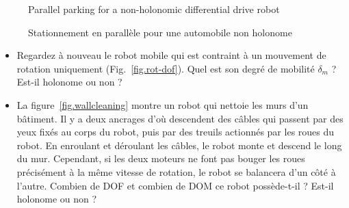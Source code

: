 \begin{figure}
\begin{minipage}{.45\textwidth}
\caption{Parallel parking for a non-holonomic differential drive robot}\label{fig.parallel-diff}
\end{minipage}
\hspace{\fill}
\begin{minipage}{.45\textwidth}
\caption{Stationnement en parallèle pour une automobile non holonome}\label{fig.parallel-car}
\end{minipage}
\end{figure}

\begin{framed}
\begin{itemize}
\item Regardez à nouveau le robot mobile qui est contraint à un mouvement de rotation uniquement (Fig.~\ref{fig.rot-dof}). Quel est son degré de mobilité $\delta_m$ ? Est-il holonome ou non ?
\item La figure~\ref{fig.wallcleaning} montre un robot qui nettoie les murs d'un bâtiment. Il y a deux ancrages d'où descendent des câbles qui passent par des yeux fixés au corps du robot, puis par des treuils actionnés par les roues du robot. En enroulant et déroulant les câbles, le robot monte et descend le long du mur. Cependant, si les deux moteurs ne font pas bouger les roues précisément à la même vitesse de rotation, le robot se balancera d'un côté à l'autre. Combien de DOF et combien de DOM ce robot possède-t-il ? Est-il holonome ou non ?
\end{itemize}
\end{framed}


